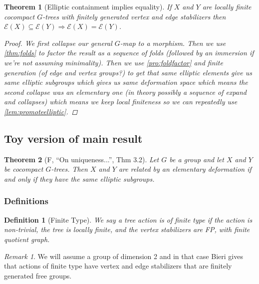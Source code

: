 \documentclass{article}
\theoremstyle{mystyle}
\newtheorem{thm}{Theorem}[section]
\newtheorem{defn}{Definition}
\theoremstyle{remark}
\newtheorem{rmk}{Remark}[section]
\begin{document}
\begin{thm}
    [Elliptic containment implies equality]
    If \(X\) and \(Y\) are locally finite cocompact \(G\)-trees with finitely generated vertex and edge stabilizers then \(\mathcal{E}(X) \subseteq \mathcal{E}(Y) \Longrightarrow \mathcal{E}(X) = \mathcal{E}(Y) \). 
    \begin{proof}

        We first collapse our general \(G\)-map to a morphism. Then we use \ref{thm:folds} to factor the result as a sequence of folds (followed by an immersion if we're not assuming minimality). Then we use \ref{pro:foldfactor} and finite generation (of edge and vertex groups?) to get that same elliptic elements give us same elliptic subgroups which gives us same deformation space which means the second collapse was an elementary one (in theory possibly a sequence of expand and collapses) which means we keep local finiteness so we can repeatedly use \ref{lem:promoteelliptic}.  
    \end{proof}
\end{thm}




\subsection{Toy version of main result}

\begin{thm}[F, ``On uniqueness...'', Thm 3.2]
\label{thm:forester}
Let $G$ be a group and let $X$ and $Y$ be cocompact $G$-trees. Then $X$ and $Y$ are related by an elementary deformation if and only if they have the same elliptic subgroups.
\end{thm}

\subsubsection{Definitions}

\begin{defn}[Finite Type]
We say a tree action is of \emph{finite type} if the action is non-trivial, the tree is locally finite, and the vertex stabilizers are FP, with finite quotient graph.
\end{defn}

\begin{rmk}
    We will assume a group of dimension 2 and in that case Bieri gives that actions of finite type have vertex and edge stabilizers that are finitely generated free groups.
\end{rmk}
\end{document}
